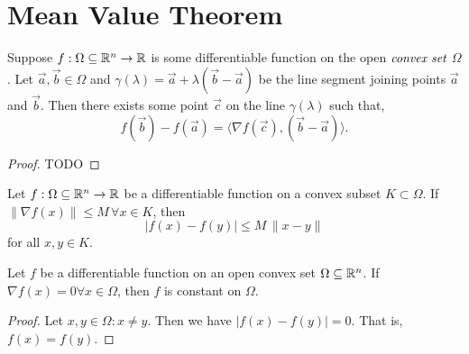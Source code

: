 
\section{Mean Value Theorem} %
\label{sec:meanvaluetheorem}

\begin{thm}
	Suppose $f: \Omega \subseteq \mathbb{R}^n \to \mathbb{R}$ is some
	differentiable function on the open $\emph{convex set}$
	$\Omega$. Let $\vec{a},\vec{b} \in \Omega$ and
	$\gamma(\lambda) = \vec{a} + \lambda (\vec{b} - \vec{a})$
	be the line segment joining points $\vec{a}$ and $\vec{b}$.
	Then there exists some point $\vec{c}$ on the line
	$\gamma(\lambda)$ such that,
	\[
		f(\vec{b}) - f(\vec{a}) =
		\langle \nabla f(\vec{c}), (\vec{b} - \vec{a}) \rangle .
	\]
\end{thm}

\begin{proof}
	TODO
\end{proof}

\begin{cor}
	Let $f: \Omega \subseteq \mathbb{R}^n \to \mathbb{R}$ be a differentiable
	function on a convex subset $K \subset \Omega$. If
	$\| \nabla f(x) \| \leq M \, \forall x \in K$, then
	\[
		| f(x) - f(y) | \leq M \, \| x - y \|
	\]
	for all $x,y \in K$.
\end{cor}

\begin{cor}
	Let $f$ be a differentiable function on an open convex
	set $\Omega \subseteq \mathbb{R}^n$.
	If $\nabla f(x)=0 \forall x \in \Omega$, then $f$ is
	constant on $\Omega$.
\end{cor}

\begin{proof}
	Let $x,y \in \Omega : x \neq y$. Then we have
	$| f(x) - f(y) | = 0$. That is, $f(x) = f(y)$.
\end{proof}

